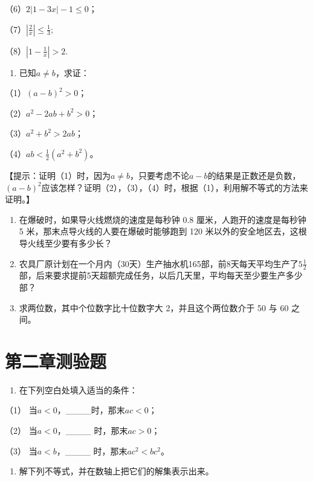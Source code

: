 （6）\(2|1 - 3x| - 1 \leqslant 0\)；

（7）\(\left|\frac{2}{x}\right|\leqslant\frac{1}{3};\)

（8）\(\left|1-\frac{1}{x}\right|>2.\)

\begin{enumerate}[start=5]
\item
  已知\(a \neq b\)，求证：
\end{enumerate}

（1）\((a - b)^{2} > 0\)；

（2）\(a^2 - 2ab + b^2 > 0\)；

（3）\(a^2 + b^2 > 2ab\)；

（4）\(ab < \frac{1}{2} (a^2 + b^2)\)。

【提示：证明（1）时，因为\(a \neq b\)，只要考虑不论\(a - b\)的结果是正数还是负数，\((a - b)^2\)应该怎样？证明（2），（3），（4）时，根据（1），利用解不等式的方法来证明。】

\begin{enumerate}[start=6]
\item
  在爆破时，如果导火线燃烧的速度是每秒钟 0.8 厘米，人跑开的速度是每秒钟
  5 米，那末点导火线的人要在爆破时能够跑到 120
  米以外的安全地区去，这根导火线至少要有多少长？
\item
  农具厂原计划在一个月内（30天）生产抽水机165部，前8天每天平均生产了\(5 \frac{1}{2}\)部，后来要求提前5天超额完成任务，以后几天里，平均每天至少要生产多少部？
\item
  求两位数，其中个位数字比十位数字大 2，并且这个两位数介于 50 与 60
  之间。
\end{enumerate}

\section{第二章测验题}

\begin{enumerate}
\item
  在下列空白处填入适当的条件：
\end{enumerate}

（1） 当\(a < 0\)，\_\_\_\_时，那末\(ac < 0\)；

（2） 当\(a < 0\)，\_\_\_\_ 时，那末\(ac > 0\)；

（3） 当\(a < b\)，\_\_\_\_ 时，那末\(ac^2 < bc^2\)。

\begin{enumerate}[start=2]
\item
  解下列不等式，并在数轴上把它们的解集表示出来。
\end{enumerate}

